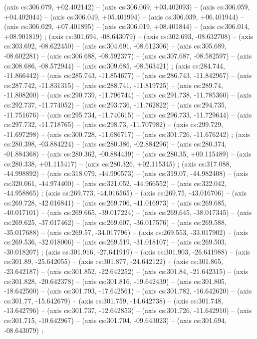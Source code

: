     (axis cs:306.079,    +02.402142) --  (axis cs:306.069,    +03.402093) --  (axis cs:306.059,    +04.402044) --  (axis cs:306.049,    +05.401994) --  (axis cs:306.039,    +06.401944) --  (axis cs:306.029,    +07.401895) --  (axis cs:306.019,    +08.401844) --  (axis cs:306.014,    +08.901819) ;
    (axis cs:301.694,    -08.643079) --  (axis cs:302.693,    -08.632708) --  (axis cs:303.692,    -08.622450) --  (axis cs:304.691,    -08.612306) --  (axis cs:305.689,    -08.602281) --  (axis cs:306.688,    -08.592377) --  (axis cs:307.687,    -08.582597) --  (axis cs:308.686,    -08.572944) --  (axis cs:309.685,    -08.563421) ;
    (axis cs:284.744,    -11.866442) --  (axis cs:285.743,    -11.854677) --  (axis cs:286.743,    -11.842967) --  (axis cs:287.742,    -11.831315) --  (axis cs:288.741,    -11.819725) --  (axis cs:289.74,    -11.808200) --  (axis cs:290.739,    -11.796744) --  (axis cs:291.738,    -11.785360) --  (axis cs:292.737,    -11.774052) --  (axis cs:293.736,    -11.762822) --  (axis cs:294.735,    -11.751676) --  (axis cs:295.734,    -11.740615) --  (axis cs:296.733,    -11.729644) --  (axis cs:297.732,    -11.718765) --  (axis cs:298.73,    -11.707982) --  (axis cs:299.729,    -11.697298) --  (axis cs:300.728,    -11.686717) --  (axis cs:301.726,    -11.676242) ;
    (axis cs:280.398,    -03.884224) --  (axis cs:280.386,    -02.884296) --  (axis cs:280.374,    -01.884368) --  (axis cs:280.362,    -00.884439) --  (axis cs:280.35,    +00.115489) --  (axis cs:280.338,    +01.115417) --  (axis cs:280.326,    +02.115345) ;
    (axis cs:317.088,    -44.998892) --  (axis cs:318.079,    -44.990573) --  (axis cs:319.07,    -44.982408) --  (axis cs:320.061,    -44.974400) --  (axis cs:321.052,    -44.966552) --  (axis cs:322.042,    -44.958865) ;
    (axis cs:269.773,    -44.016565) --  (axis cs:269.75,    -43.016706) --  (axis cs:269.728,    -42.016841) --  (axis cs:269.706,    -41.016973) --  (axis cs:269.685,    -40.017101) --  (axis cs:269.665,    -39.017224) --  (axis cs:269.645,    -38.017345) --  (axis cs:269.625,    -37.017462) --  (axis cs:269.607,    -36.017576) --  (axis cs:269.588,    -35.017688) --  (axis cs:269.57,    -34.017796) --  (axis cs:269.553,    -33.017902) --  (axis cs:269.536,    -32.018006) --  (axis cs:269.519,    -31.018107) --  (axis cs:269.503,    -30.018207) ;
    (axis cs:301.916,    -27.641919) --  (axis cs:301.903,    -26.641988) --  (axis cs:301.89,    -25.642055) --  (axis cs:301.877,    -24.642122) --  (axis cs:301.865,    -23.642187) --  (axis cs:301.852,    -22.642252) --  (axis cs:301.84,    -21.642315) --  (axis cs:301.828,    -20.642378) --  (axis cs:301.816,    -19.642439) --  (axis cs:301.805,    -18.642500) --  (axis cs:301.793,    -17.642561) --  (axis cs:301.782,    -16.642620) --  (axis cs:301.77,    -15.642679) --  (axis cs:301.759,    -14.642738) --  (axis cs:301.748,    -13.642796) --  (axis cs:301.737,    -12.642853) --  (axis cs:301.726,    -11.642910) --  (axis cs:301.715,    -10.642967) --  (axis cs:301.704,    -09.643023) --  (axis cs:301.694,    -08.643079) ;
